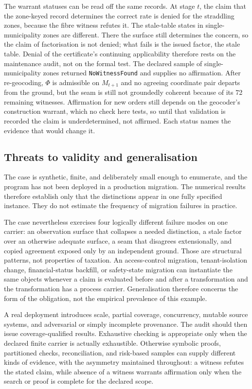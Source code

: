 \documentclass[twocolumn,envcountsect,envcountsame,natbib]{svjour3}
\newcommand{\code}[1]{\texttt{#1}}
\begin{document}
The warrant statuses can be read off the same records. At stage $t$, the claim that the zone-keyed record determines the correct rate is denied for the straddling zones, because the fibre witness refutes it. The stale-table states in single-municipality zones are different. There the surface still determines the concern, so the claim of factorisation is not denied; what fails is the issued factor, the stale table. Denial of the certificate's continuing applicability therefore rests on the maintenance audit, not on the formal test. The declared sample of single-municipality zones returned \code{NoWitnessFound} and supplies no affirmation. After re-geocoding, $\Phi$ is admissible on $M_{t+1}$ and no agreeing coordinate pair departs from the ground, but the seam is still not groundedly coherent because of its 72 remaining witnesses. Affirmation for new orders still depends on the geocoder's construction warrant, which no check here tests, so until that validation is recorded the claim is underdetermined, not affirmed. Each status names the evidence that would change it.

\subsection{Threats to validity and generalisation}\label{ex:sec:threats}
The case is synthetic, finite, and deliberately small enough to enumerate, and the program has not been deployed in a production migration. The numerical results therefore establish only that the distinctions appear in one fully specified instance. They do not estimate the frequency of migration failures in practice.

The case nevertheless exercises four logically different failure modes on one carrier: an observation surface that collapses a needed distinction, a stale factor over an otherwise adequate surface, a seam that disagrees extensionally, and copied agreement exposed only by an independent ground. Those are structural patterns, not properties of taxation. An access-control migration, tenant-isolation change, financial-status backfill, or safety-state migration can instantiate the same objects whenever a claim is evaluated before and after a transformation and the transformation has a process carrier. Generalisation therefore concerns the form of the obligation, not the empirical prevalence of this example.

A real deployment introduces scale, partial coverage, concurrency, mutable source systems, and adversarial or simply incomplete provenance. The audit should then issue coverage-qualified results. Exhaustive checking is appropriate only when the declared finite carrier is actually exhaustible. Otherwise symbolic proofs, partitioned checks, reconciliation, and risk-based samples can supply different kinds of evidence, with the asymmetry maintained throughout: a witness refutes the stated claim, while absence of a witness warrants affirmation only when the search or proof is complete for the declared scope.
\end{document}
